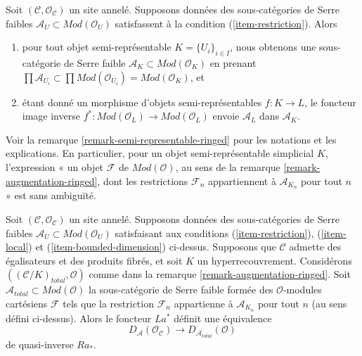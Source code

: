 \noindent
Soit $(\mathcal{C}, \mathcal{O}_\mathcal{C})$ un site annelé.
Supposons données des sous-catégories de Serre faibles
$\mathcal{A}_U \subset \textit{Mod}(\mathcal{O}_U)$
satisfassent à la condition (\ref{item-restriction}).
Alors
\begin{enumerate}
\item pour tout objet semi-représentable $K = \{U_i\}_{i \in I}$,
nous obtenons une sous-catégorie de Serre faible
$\mathcal{A}_K \subset \textit{Mod}(\mathcal{O}_K)$
en prenant $\prod \mathcal{A}_{U_i} \subset 
\prod \textit{Mod}(\mathcal{O}_{U_i}) = \textit{Mod}(\mathcal{O}_K)$, et
\item étant donné un morphisme d'objets semi-représentables
$f : K \to L$, le foncteur image inverse
$f^* : \textit{Mod}(\mathcal{O}_L) \to \textit{Mod}(\mathcal{O}_L)$
envoie $\mathcal{A}_L$ dans $\mathcal{A}_K$.
\end{enumerate}
Voir la remarque \ref{remark-semi-representable-ringed} pour les notations et les
explications. En particulier, pour un objet semi-représentable simplicial $K$,
l'expression « un objet $\mathcal{F}$ de
$\textit{Mod}(\mathcal{O})$, au sens de la remarque \ref{remark-augmentation-ringed},
dont les restrictions $\mathcal{F}_n$ appartiennent à
$\mathcal{A}_{K_n}$ pour tout $n$ » est sans ambiguïté.

\begin{lemma}
\label{lemma-hypercovering-equivalence-modules}
Soit $(\mathcal{C}, \mathcal{O}_\mathcal{C})$ un site annelé.
Supposons données des sous-catégories de Serre faibles
$\mathcal{A}_U \subset \textit{Mod}(\mathcal{O}_U)$
satisfaisant aux conditions (\ref{item-restriction}),
(\ref{item-local}) et (\ref{item-bounded-dimension}) ci-dessus.
Supposons que $\mathcal{C}$ admette des égalisateurs et des produits fibrés, et
soit $K$ un hyperrecouvrement.
Considérons $((\mathcal{C}/K)_{total}, \mathcal{O})$ comme dans
la remarque \ref{remark-augmentation-ringed}.
Soit $\mathcal{A}_{total} \subset \textit{Mod}(\mathcal{O})$
la sous-catégorie de Serre faible formée des $\mathcal{O}$-modules cartésiens
$\mathcal{F}$ tels que la restriction $\mathcal{F}_n$ appartienne à
$\mathcal{A}_{K_n}$ pour tout $n$ (au sens défini ci-dessus).
Alors le foncteur $La^*$ définit une équivalence
$$
D_\mathcal{A}(\mathcal{O}_\mathcal{C})
\longrightarrow
D_{\mathcal{A}_{total}}(\mathcal{O})
$$
de quasi-inverse $Ra_*$.
\end{lemma}

